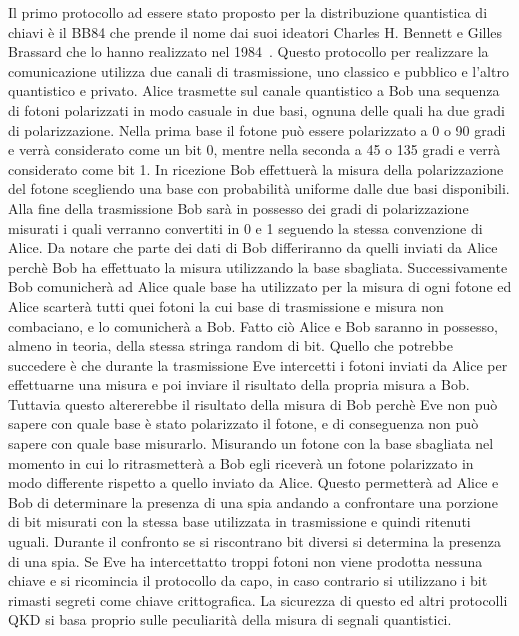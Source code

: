 Il primo protocollo ad essere stato proposto per la distribuzione quantistica di chiavi \`e il BB84 che prende il nome dai suoi ideatori Charles H. Bennett e Gilles Brassard che lo hanno realizzato nel 1984~\cite{ Bennett_2014}.
Questo protocollo per realizzare la comunicazione utilizza due canali di trasmissione, uno classico e pubblico e l'altro quantistico e privato. Alice trasmette sul canale quantistico a Bob una sequenza di fotoni polarizzati in modo casuale in due basi, ognuna delle quali ha due gradi di polarizzazione. Nella prima base il fotone pu\`o essere polarizzato a 0 o 90 gradi e verr\`a considerato come un bit 0, mentre nella seconda a 45 o 135 gradi e verr\`a considerato come bit 1.
In ricezione Bob effettuer\`a la misura della polarizzazione del fotone scegliendo una base con probabilit\`a uniforme dalle due basi disponibili. Alla fine della trasmissione Bob sar\`a in possesso dei gradi di polarizzazione misurati i quali verranno convertiti in 0 e 1 seguendo la stessa convenzione di Alice. Da notare che parte dei dati di Bob differiranno da quelli inviati da Alice perch\`e Bob ha effettuato la misura utilizzando la base sbagliata.
Successivamente Bob comunicher\`a ad Alice quale base ha utilizzato per la misura di ogni fotone ed Alice scarter\`a tutti quei fotoni la cui base di trasmissione e misura non combaciano, e lo comunicher\`a a Bob. Fatto ci\`o Alice e Bob saranno in possesso, almeno in teoria, della stessa stringa random di bit.
Quello che potrebbe succedere \`e che durante la trasmissione Eve intercetti i fotoni inviati da Alice per effettuarne una misura e poi inviare il risultato della propria misura a Bob. Tuttavia questo altererebbe il risultato della misura di Bob perch\`e Eve non pu\`o sapere con quale base \`e stato polarizzato il fotone, e di conseguenza non pu\`o sapere con quale base misurarlo. Misurando un fotone con la base sbagliata nel momento in cui lo ritrasmetter\`a a Bob egli ricever\`a un fotone polarizzato in modo differente rispetto a quello inviato da Alice. Questo permetter\`a ad Alice e Bob di determinare la presenza di una spia andando a confrontare una porzione di bit misurati con la stessa base utilizzata in trasmissione e quindi ritenuti uguali. Durante il confronto se si riscontrano bit diversi si determina la presenza di una spia. Se Eve ha intercettatto troppi fotoni non viene prodotta nessuna chiave e si ricomincia il protocollo da capo, in caso contrario si utilizzano i bit rimasti segreti come chiave crittografica\cite{zhao_development_2018}. La sicurezza di questo ed altri protocolli QKD si basa proprio sulle peculiarit\`a della misura di segnali quantistici.

